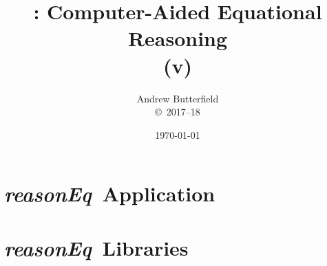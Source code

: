 \documentclass[fleqn,10pt]{report}
\author{
Andrew Butterfield
\\
{\small \copyright\ 2017--18}
}
\title{
  \reasonEq: Computer-Aided Equational Reasoning
  \\(v\reqVersion)
}
\date{
\today
}
\def\reasonEq{\textit{\textsf{reasonEq}}}
\begin{document}
\maketitle
\tableofcontents

\chapter{\reasonEq\ Application}

% 

\chapter{\reasonEq\ Libraries}

% 
% 
% 
% 
% 
% 
% 
% 
% 
% 
% 
% 
% 
% 
% 
% 
% 
% 
% 
% 
% 
% 
% 
\newpage

\newpage

\newpage

\newpage

\newpage



%
% 
%
%
% 
% 
% 
%


%
%
%
% 
\end{document}
